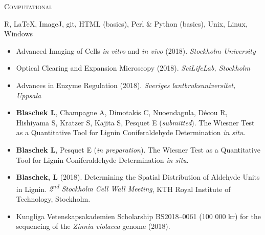 \documentclass[11pt]{article}
\begin{document}
\textsc{\large{Computational}} 
\begin{addmargin}[24pt]{0pt}
	R, LaTeX, ImageJ, git, HTML (basics), Perl \& Python (basics), Unix, Linux, Windows
\end{addmargin}	
\vspace{0.5cm}

\vspace{-0.175cm}
\begin{itemize}[label={},itemindent=-9pt,leftmargin=24pt]
	\itemsep-0.1cm
	\item Advanced Imaging of Cells \textit{in vitro} and \textit{in vivo} (2018). \textit{Stockholm University} 
	\item Optical Clearing and Expansion Microscopy (2018). \textit{SciLifeLab, Stockholm} 	
	\item Advances in Enzyme Regulation (2018). \textit{Sveriges lantbruksuniversitet, Uppsala} 
\end{itemize}
\vspace{0.3cm}

\vspace{-0.175cm}
\begin{itemize}[label={},itemindent=-9pt,leftmargin=24pt]
	\itemsep-0.1cm
	\item \textbf{Blaschek L}, Champagne A, Dimotakis C, Nuoendagula, Décou R, Hishiyama S, Kratzer S, Kajita S, Pesquet E (\textit{submitted}). The Wiesner Test as a Quantitative Tool for Lignin Coniferaldehyde Determination \textit{in situ}.
	\item \textbf{Blaschek L}, Pesquet E (\textit{in preparation}). The Wiesner Test as a Quantitative Tool for Lignin Coniferaldehyde Determination \textit{in situ}.
\end{itemize}
\vspace{0.3cm}

\vspace{-0.175cm}
\begin{itemize}[label={},itemindent=-9pt,leftmargin=24pt]
	\itemsep-0.1cm
	\item \textbf{Blaschek, L} (2018). Determining the Spatial Distribution of Aldehyde Units in Lignin. \textit{2\textsuperscript{nd} Stockholm Cell Wall Meeting}, KTH Royal Institute of Technology, Stockholm.
\end{itemize}
\vspace{0.3cm}

\vspace{-0.175cm}
\begin{itemize}[label={},itemindent=-9pt,leftmargin=24pt]
	\itemsep-0.1cm
	\item Kungliga Vetenskapsakademien Scholarship BS2018--0061 (100 000 kr) for the sequencing of the \textit{Zinnia violacea} genome (2018). 
\end{itemize}
\newpage
\end{document}
